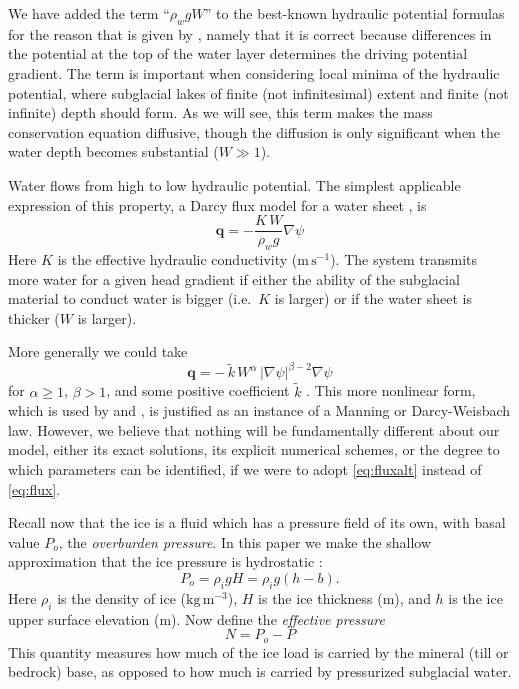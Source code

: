 \documentclass[11pt,final]{amsart}%
\newcommand\bq{\mathbf{q}}
\newcommand{\grad}{\nabla}
\begin{document}
We have added the term ``$\rho_w g W$'' to the best-known hydraulic potential formulas \citep[e.g.]{Clarke05} for the reason that is given by \cite{Hewittetal2012}, namely that it is correct because differences in the potential at the top of the water layer determines the driving potential gradient.  The term is important when considering local minima of the hydraulic potential, where subglacial lakes of finite (not infinitesimal) extent and finite (not infinite) depth should form.  As we will see, this term makes the mass conservation equation diffusive, though the diffusion is only significant when the water depth becomes substantial ($W\gg 1$).

Water flows from high to low hydraulic potential.  The simplest applicable expression of this property, a Darcy flux model for a water sheet \citep{Clarke05}, is
\begin{equation}  \label{eq:flux}
\bq = - \frac{K \, W}{\rho_w g} \grad \psi
\end{equation}
Here $K$ is the effective hydraulic conductivity ($\text{m}\,\text{s}^{-1}$).  The system transmits more water for a given head gradient if either the ability of the subglacial material to conduct water is bigger (i.e.~$K$ is larger) or if the water sheet is thicker ($W$ is larger).

More generally we could take
\begin{equation}  \label{eq:fluxalt}
\bq = - \,\tilde k\, W^\alpha\, |\grad \psi|^{\beta-2} \grad \psi
\end{equation}
for $\alpha\ge 1$, $\beta>1$, and some positive coefficient $\tilde k$ \citep{Schoofetal2012}.  This more nonlinear form, which is used by \cite{Hewittetal2012} and \cite{Schoofetal2012}, is justified as an instance of a Manning or Darcy-Weisbach law.  However, we believe that nothing will be fundamentally different about our model, either its exact solutions, its explicit numerical schemes, or the degree to which parameters can be identified, if we were to adopt \eqref{eq:fluxalt} instead of \eqref{eq:flux}.

Recall now that the ice is a fluid which has a pressure field of its own, with basal value $P_o$, the \emph{overburden pressure}.  In this paper we make the shallow approximation that the ice pressure is hydrostatic \citep{GreveBlatter2009}:
\begin{equation} \label{eq:hydrostatic}
  P_o = \rho_i g H = \rho_i g (h-b).
\end{equation}
Here $\rho_i$ is the density of ice ($\text{kg}\,\text{m}^{-3}$), $H$ is the ice thickness (m), and $h$ is the ice upper surface elevation (m).  Now define the \emph{effective pressure}
\begin{equation}
N = P_o - P\label{eq:effective}
\end{equation}
This quantity measures how much of the ice load is carried by the mineral (till or bedrock) base, as opposed to how much is carried by pressurized subglacial water.
\end{document}
